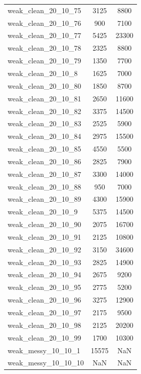 \begin{longtable}{lcc}
weak\_clean\_20\_10\_75    &     3125 &   8800 \\
weak\_clean\_20\_10\_76    &      900 &   7100 \\
weak\_clean\_20\_10\_77    &     5425 &  23300 \\
weak\_clean\_20\_10\_78    &     2325 &   8800 \\
weak\_clean\_20\_10\_79    &     1350 &   7700 \\
weak\_clean\_20\_10\_8     &     1625 &   7000 \\
weak\_clean\_20\_10\_80    &     1850 &   8700 \\
weak\_clean\_20\_10\_81    &     2650 &  11600 \\
weak\_clean\_20\_10\_82    &     3375 &  14500 \\
weak\_clean\_20\_10\_83    &     2525 &   5900 \\
weak\_clean\_20\_10\_84    &     2975 &  15500 \\
weak\_clean\_20\_10\_85    &     4550 &   5500 \\
weak\_clean\_20\_10\_86    &     2825 &   7900 \\
weak\_clean\_20\_10\_87    &     3300 &  14000 \\
weak\_clean\_20\_10\_88    &      950 &   7000 \\
weak\_clean\_20\_10\_89    &     4300 &  15900 \\
weak\_clean\_20\_10\_9     &     5375 &  14500 \\
weak\_clean\_20\_10\_90    &     2075 &  16700 \\
weak\_clean\_20\_10\_91    &     2125 &  10800 \\
weak\_clean\_20\_10\_92    &     3150 &  34600 \\
weak\_clean\_20\_10\_93    &     2825 &  14900 \\
weak\_clean\_20\_10\_94    &     2675 &   9200 \\
weak\_clean\_20\_10\_95    &     2775 &   5200 \\
weak\_clean\_20\_10\_96    &     3275 &  12900 \\
weak\_clean\_20\_10\_97    &     2175 &   9500 \\
weak\_clean\_20\_10\_98    &     2125 &  20200 \\
weak\_clean\_20\_10\_99    &     1700 &  10300 \\
weak\_messy\_10\_10\_1     &    15575 &    NaN \\
weak\_messy\_10\_10\_10    &      NaN &    NaN \\

\end{longtable}
